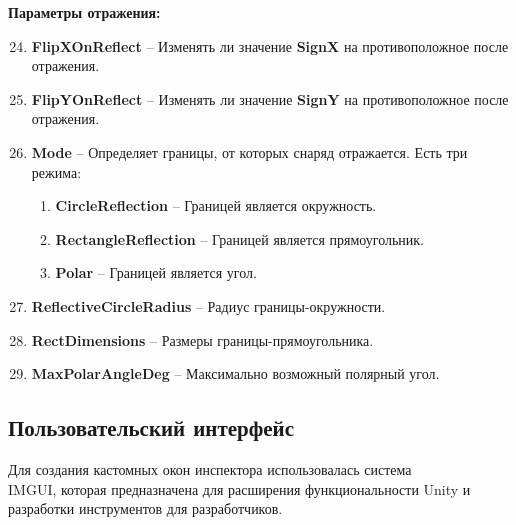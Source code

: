 \textbf{Параметры отражения:}
\begin{enumerate}
    \setcounter{enumi}{23}
    \item {\small \textbf{FlipXOnReflect}} -- Изменять ли значение {\small \textbf{SignX}} на противоположное после отражения.
    \item {\small \textbf{FlipYOnReflect}} -- Изменять ли значение {\small \textbf{SignY}} на противоположное после отражения.
    \item {\small \textbf{Mode}} -- Определяет границы, от которых снаряд отражается. Есть три режима:
    \begin{enumerate}[label=\textbullet]
        \item {\small \textbf{CircleReflection}} -- Границей является окружность.
        \item {\small \textbf{RectangleReflection}} -- Границей является прямоугольник.
        \item {\small \textbf{Polar}} -- Границей является угол.
    \end{enumerate}
    \item {\small \textbf{ReflectiveCircleRadius}} -- Радиус границы-окружности.
    \item {\small \textbf{RectDimensions}} -- Размеры границы-прямоугольника.
    \item {\small \textbf{MaxPolarAngleDeg}} -- Максимально возможный полярный угол.
\end{enumerate}

\pagebreak


\subsection{Пользовательский интерфейс}

Для создания кастомных окон инспектора использовалась система\\ IMGUI\cite{s10}, которая предназначена для расширения функциональности Unity и разработки инструментов для разработчиков.

